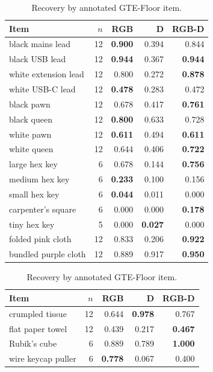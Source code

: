 \begin{table}[H]
\caption{Recovery by annotated GTE-Floor item.}\label{tab:per-item}
\centering\footnotesize
\setlength{\tabcolsep}{3pt}
\begin{minipage}[t]{.49\textwidth}\centering
\begin{tabular}{lrrrr}
\toprule Item & $n$ & RGB & D & RGB-D\\\midrule
black mains lead & 12 & \textbf{0.900} & 0.394 & 0.844\\
black USB lead & 12 & \textbf{0.944} & 0.367 & \textbf{0.944}\\
white extension lead & 12 & 0.800 & 0.272 & \textbf{0.878}\\
white USB-C lead & 12 & \textbf{0.478} & 0.283 & 0.472\\
black pawn & 12 & 0.678 & 0.417 & \textbf{0.761}\\
black queen & 12 & \textbf{0.800} & 0.633 & 0.728\\
white pawn & 12 & \textbf{0.611} & 0.494 & \textbf{0.611}\\
white queen & 12 & 0.644 & 0.406 & \textbf{0.722}\\
large hex key & 6 & 0.678 & 0.144 & \textbf{0.756}\\
medium hex key & 6 & \textbf{0.233} & 0.100 & 0.156\\
small hex key & 6 & \textbf{0.044} & 0.011 & 0.000\\
carpenter's square & 6 & 0.000 & 0.000 & \textbf{0.178}\\
tiny hex key & 5 & 0.000 & \textbf{0.027} & 0.000\\
folded pink cloth & 12 & 0.833 & 0.206 & \textbf{0.922}\\
bundled purple cloth & 12 & 0.889 & 0.917 & \textbf{0.950}\\
\bottomrule\end{tabular}\end{minipage}\hfill
\begin{minipage}[t]{.49\textwidth}\centering
\begin{tabular}{lrrrr}
\toprule Item & $n$ & RGB & D & RGB-D\\\midrule
crumpled tissue & 12 & 0.644 & \textbf{0.978} & 0.767\\
flat paper towel & 12 & 0.439 & 0.217 & \textbf{0.467}\\
Rubik's cube & 6 & 0.889 & 0.789 & \textbf{1.000}\\
wire keycap puller & 6 & \textbf{0.778} & 0.067 & 0.400\\

\end{tabular}
\end{minipage}
\end{table}
